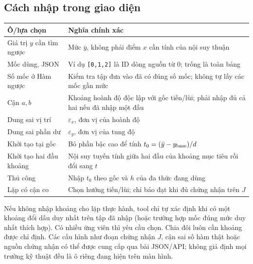 \subsection{Cách nhập trong giao diện}
\begin{center}\small
\begin{tabular}{@{}p{.30\linewidth}p{.59\linewidth}@{}}\toprule
Ô/lựa chọn & Nghĩa chính xác\\\midrule
Giá trị $y$ cần tìm ngược & Mức $\bar y$, không phải điểm $x$ cần tính của nội suy thuận\\
Mốc dùng, JSON & Ví dụ \texttt{[0,1,2]} là ID dòng nguồn từ 0; trống là toàn bảng\\
Số mốc ở Hàm ngược & Kiểm tra tập đưa vào đã có đúng số mốc; không tự lấy các mốc gần mức\\
Cận $a,b$ & Khoảng hoành độ độc lập với gốc tiến/lùi; phải nhập đủ cả hai nếu đã nhập một đầu\\
Dung sai vị trí & $\varepsilon_x$, đơn vị của hoành độ\\
Dung sai phần dư & $\varepsilon_y$, đơn vị của tung độ\\
Khởi tạo tại gốc & Bỏ phần bậc cao để tính $t_0=(\bar y-y_{\rm base})/d$\\
Khởi tạo hai đầu khoảng & Nội suy tuyến tính giữa hai đầu của khoảng mục tiêu rồi đổi sang $t$\\
Thủ công & Nhập $t_0$ theo gốc và $h$ của đa thức đang dùng\\
Lặp có cận co & Chọn hướng tiến/lùi; chỉ báo đạt khi đủ chứng nhận trên $J$\\\bottomrule
\end{tabular}\end{center}

Nếu không nhập khoảng cho lặp thực hành, tool chỉ tự xác định khi có một khoảng đổi dấu duy nhất trên tập đã nhập (hoặc trường hợp mốc đúng mức duy nhất thích hợp). Có nhiều ứng viên thì yêu cầu chọn. Chia đôi luôn cần khoảng được chỉ định. Các cấu hình như đoạn chứng nhận $J$, cận sai số hàm thật hoặc nguồn chứng nhận có thể được cung cấp qua bài JSON/API; không giả định mọi trường kỹ thuật đều là ô riêng đang hiện trên màn hình.

